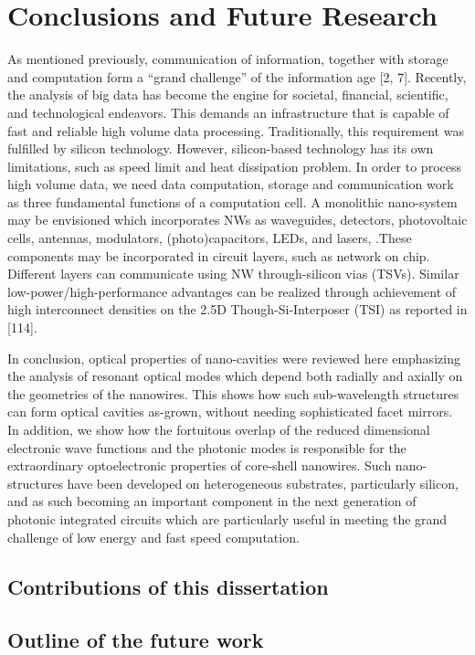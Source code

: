 \chapter{Conclusions and Future Research} \label{conclusions}

As mentioned previously, communication of information, together with storage
and computation form a “grand challenge” of the information age [2, 7].
Recently, the analysis of big data has become the engine for societal,
financial, scientific, and technological endeavors. This demands an
infrastructure that is capable of fast and reliable high volume data
processing. Traditionally, this requirement was fulfilled by silicon
technology. However, silicon-based technology has its own limitations, such as
speed limit and heat dissipation problem. In order to process high volume data,
we need data computation, storage and communication work as three fundamental
functions of a computation cell. A monolithic nano-system may be envisioned
which incorporates NWs as waveguides, detectors, photovoltaic cells, antennas,
modulators, (photo)capacitors, LEDs, and lasers, .These components may be
incorporated in circuit layers, such as network on chip. Different layers can
communicate using NW through-silicon vias (TSVs). Similar
low-power/high-performance advantages can be realized through achievement of
high interconnect densities on the 2.5D Though-Si-Interposer (TSI) as reported
in [114].

In conclusion, optical properties of nano-cavities were reviewed
here emphasizing the analysis of resonant optical modes which depend both
radially and axially on the geometries of the nanowires. This shows how such
sub-wavelength structures can form optical cavities as-grown, without needing
sophisticated facet mirrors. In addition, we show how the fortuitous overlap of
the reduced dimensional electronic wave functions and the photonic modes is
responsible for the extraordinary optoelectronic properties of core-shell
nanowires. Such nano-structures have been developed on heterogeneous
substrates, particularly silicon, and as such becoming an important component
in the next generation of photonic integrated circuits which are particularly
useful in meeting the grand challenge of low energy and fast speed computation.

\section{Contributions of this dissertation}
\section{Outline of the future work}

